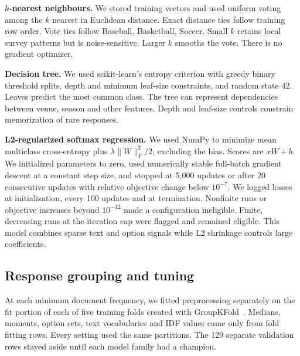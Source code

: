 \documentclass[12pt]{article}
\begin{document}
\textbf{$k$-nearest neighbours.} We stored training vectors and used uniform
voting among the $k$ nearest in Euclidean distance. Exact distance ties follow
training row order. Vote ties follow Baseball, Basketball, Soccer. Small $k$
retains local survey patterns but is noise-sensitive. Larger $k$ smooths the
vote. There is no gradient optimizer.

\textbf{Decision tree.} We used scikit-learn's entropy criterion with greedy
binary threshold splits, depth and minimum leaf-size constraints, and random
state 42. Leaves predict the most common class. The tree can represent
dependencies between venue, season and other features. Depth and leaf-size
controls constrain memorization of rare responses.

\textbf{L2-regularized softmax regression.} We used NumPy to minimize mean
multiclass cross-entropy plus $\lambda\|W\|_F^2/2$, excluding the bias. Scores
are $xW+b$. We initialized parameters to zero, used numerically stable
full-batch gradient descent at a constant step size, and stopped at 5,000
updates or after 20 consecutive updates with relative objective change below
$10^{-7}$. We logged losses at initialization, every 100 updates and at
termination. Nonfinite runs or objective increases beyond $10^{-12}$ made a
configuration ineligible. Finite, decreasing runs at the iteration cap were
flagged and remained eligible. This model combines sparse text and option
signals while L2 shrinkage controls large coefficients.

\subsection*{Response grouping and tuning}

At each minimum document frequency, we fitted preprocessing separately on the
fit portion of each of five training folds created with
GroupKFold~\cite{skl-groupkfold}. Medians, moments, option sets, text
vocabularies and IDF values came only from fold fitting rows. Every setting
used the same partitions. The 129 separate validation rows stayed aside until
each model family had a champion.
\end{document}
